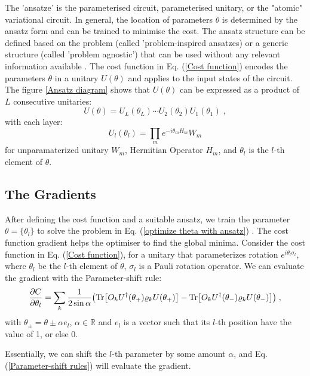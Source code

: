 The 'ansatze' is the parameterised circuit, parameterised unitary, or the "atomic" variational circuit.
In general, the location of parameters $\theta$ is determined by the ansatz form and can be trained to minimise the cost.
The ansatz structure can be defined based on the problem (called 'problem-inspired ansatzes) or a generic structure (called 'problem agnostic') that can be used without any relevant information available \cite{cerezo2021variational}.
The cost function in Eq. (\ref{Cost function}) encodes the parameters $\theta$ in a unitary $U(\theta)$ and applies to the input states of the circuit. 
The figure \ref{Ansatz diagram} shows that $U(\theta)$ can be expressed as a product of $L$ consecutive unitaries:
\begin{equation}
    U(\theta) = U_L(\theta_L) \cdots U_2(\theta_2) U_1(\theta_1)\;,
\end{equation}
with each layer:
\begin{equation}
    U_l(\theta_l) = \prod_m e^{-i\theta_m H_m} W_m
\end{equation}
for unparamaterized unitary $W_m$, Hermitian Operator $H_m$, and $\theta_l$ is the $l$-th element of $\theta$.

\subsection{The Gradients}
After defining the cost function and a suitable ansatz, we train the parameter $\theta = \{\theta_{l}\}$ to solve the problem in Eq. (\ref{optimize theta with ansatz}) \cite{cerezo2021variational}.
The cost function gradient helps the optimiser to find the global minima. 
Consider the cost function in Eq. (\ref{Cost function}), for a unitary that parameterizes rotation $e^{i \theta_l \sigma_{l}}$, where $\theta_l$ be the $l$-th element of $\theta$, $\sigma_l$ is a Pauli rotation operator. 
We can evaluate the gradient with the Parameter-shift rule:
\begin{equation}
    \frac{\partial C}{\partial\theta_l}
    = \sum_k \frac{1}{2 \sin{\alpha}} 
    \left( 
        \Tr[O_k U^\dagger(\theta_+) \rho_k U(\theta_+)] 
        - \Tr[O_k U^\dagger(\theta_-) \rho_k U(\theta_-)]
    \right) \;,
    \label{Parameter-shift rules}
\end{equation}
with $\theta_{\pm} = \theta \pm \alpha e_l$, $\alpha \in \mathbb{R}$ and $e_l$ is a vector such that its $l$-th position have the value of 1, or else 0.

Essentially, we can shift the $l$-th parameter by some amount $\alpha$, and Eq. (\ref{Parameter-shift rules}) will evaluate the gradient. 


